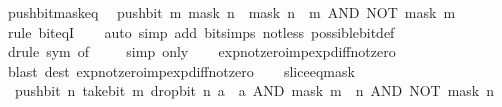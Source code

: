 \begin{isabellebody}
\isanewline
%
\endisadelimproof
\isanewline
{}\isamarkupfalse%
\ push{\isacharunderscore}{\kern0pt}bit{\isacharunderscore}{\kern0pt}mask{\isacharunderscore}{\kern0pt}eq{\isacharcolon}{\kern0pt}\isanewline
\ \ {\isacartoucheopen}push{\isacharunderscore}{\kern0pt}bit\ m\ {\isacharparenleft}{\kern0pt}mask\ n{\isacharparenright}{\kern0pt}\ {\isacharequal}{\kern0pt}\ mask\ {\isacharparenleft}{\kern0pt}n\ {\isacharplus}{\kern0pt}\ m{\isacharparenright}{\kern0pt}\ AND\ NOT\ {\isacharparenleft}{\kern0pt}mask\ m{\isacharparenright}{\kern0pt}{\isacartoucheclose}\isanewline
%
\isadelimproof
\ \ %
\endisadelimproof
%
\isatagproof
{}\isamarkupfalse%
\ {\isacharparenleft}{\kern0pt}rule\ bit{\isacharunderscore}{\kern0pt}eqI{\isacharparenright}{\kern0pt}\isanewline
\ \ \isamarkupfalse%
\ {\isacharparenleft}{\kern0pt}auto\ simp\ add{\isacharcolon}{\kern0pt}\ bit{\isacharunderscore}{\kern0pt}simps\ not{\isacharunderscore}{\kern0pt}less\ possible{\isacharunderscore}{\kern0pt}bit{\isacharunderscore}{\kern0pt}def{\isacharparenright}{\kern0pt}\isanewline
\ \ \isamarkupfalse%
\ {\isacharparenleft}{\kern0pt}drule\ sym\ {\isacharbrackleft}{\kern0pt}of\ {}{\isacharbrackright}{\kern0pt}{\isacharparenright}{\kern0pt}\isanewline
\ \ \isamarkupfalse%
\ {\isacharparenleft}{\kern0pt}simp\ only{\isacharcolon}{\kern0pt}{\isacharparenright}{\kern0pt}\isanewline
\ \ \isamarkupfalse%
\ exp{\isacharunderscore}{\kern0pt}not{\isacharunderscore}{\kern0pt}zero{\isacharunderscore}{\kern0pt}imp{\isacharunderscore}{\kern0pt}exp{\isacharunderscore}{\kern0pt}diff{\isacharunderscore}{\kern0pt}not{\isacharunderscore}{\kern0pt}zero\ \isamarkupfalse%
\ {\isacharparenleft}{\kern0pt}blast\ dest{\isacharcolon}{\kern0pt}\ exp{\isacharunderscore}{\kern0pt}not{\isacharunderscore}{\kern0pt}zero{\isacharunderscore}{\kern0pt}imp{\isacharunderscore}{\kern0pt}exp{\isacharunderscore}{\kern0pt}diff{\isacharunderscore}{\kern0pt}not{\isacharunderscore}{\kern0pt}zero{\isacharparenright}{\kern0pt}\isanewline
\ \ \isamarkupfalse%
%
\endisatagproof
{\isafoldproof}%
%
\isadelimproof
\isanewline
%
\endisadelimproof
\isanewline
{}\isamarkupfalse%
\ slice{\isacharunderscore}{\kern0pt}eq{\isacharunderscore}{\kern0pt}mask{\isacharcolon}{\kern0pt}\isanewline
\ \ {\isacartoucheopen}push{\isacharunderscore}{\kern0pt}bit\ n\ {\isacharparenleft}{\kern0pt}take{\isacharunderscore}{\kern0pt}bit\ m\ {\isacharparenleft}{\kern0pt}drop{\isacharunderscore}{\kern0pt}bit\ n\ a{\isacharparenright}{\kern0pt}{\isacharparenright}{\kern0pt}\ {\isacharequal}{\kern0pt}\ a\ AND\ mask\ {\isacharparenleft}{\kern0pt}m\ {\isacharplus}{\kern0pt}\ n{\isacharparenright}{\kern0pt}\ AND\ NOT\ {\isacharparenleft}{\kern0pt}mask\ n{\isacharparenright}{\kern0pt}{\isacartoucheclose}\isanewline

\end{isabellebody}
